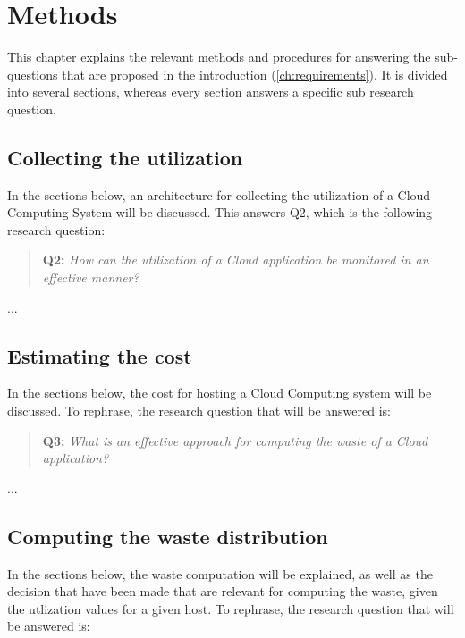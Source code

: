 \chapter{Methods}\label{ch:methods}
This chapter explains the relevant methods and procedures for answering the sub-questions that are proposed in the introduction (\autoref{ch:requirements}). It is divided into several sections, whereas every section answers a specific sub research question.

\section{Collecting the utilization} \label{sec:collect_utilization}
In the sections below, an architecture for collecting the utilization of a Cloud Computing System will be discussed. This answers Q2, which is the following research question:

\begin{quote}
	\textbf{Q2: }\textit{How can the utilization of a Cloud application be monitored in an effective manner?}\\
\end{quote}

...

\section{Estimating the cost} \label{sec:cost}
In the sections below, the cost for hosting a Cloud Computing system will be discussed. To rephrase, the research question that will be answered is:

\begin{quote}
	\textbf{Q3: }\textit{What is an effective approach for computing the waste of a Cloud application?}\\
\end{quote}

...


\section{Computing the waste distribution} \label{sec:waste_into}
In the sections below, the waste computation will be explained, as well as the decision that have been made that are relevant for computing the waste, given the utlization values for a given host. To rephrase, the research question that will be answered is:

